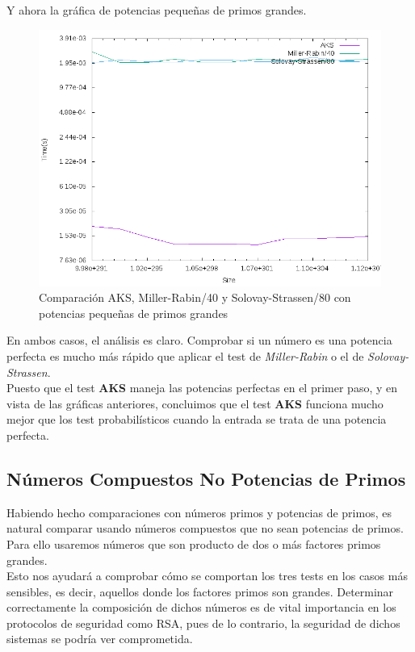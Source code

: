 Y ahora la gráfica de potencias pequeñas de primos grandes.

\begin{figure}[H]
	\centering
	\includegraphics[totalheight=12cm]{img/graphs/aks-probs-powers-5-mean}
	\caption{Comparación AKS, Miller-Rabin/40 y Solovay-Strassen/80 con potencias pequeñas de primos grandes}
\end{figure}

En ambos casos, el análisis es claro. Comprobar si un número es una potencia perfecta es mucho más rápido que aplicar el test de \textit{Miller-Rabin} o el de \textit{Solovay-Strassen}.\\

Puesto que el test \textbf{AKS} maneja las potencias perfectas en el primer paso, y en vista de las gráficas anteriores, concluimos que el test \textbf{AKS} funciona mucho mejor que los test probabilísticos cuando la entrada se trata de una potencia perfecta.

\subsection{Números Compuestos No Potencias de Primos}

Habiendo hecho comparaciones con números primos y potencias de primos, es natural comparar usando números compuestos que no sean potencias de primos. Para ello usaremos números que son producto de dos o más factores primos grandes.\\

Esto nos ayudará a comprobar cómo se comportan los tres tests en los casos más sensibles, es decir, aquellos donde los factores primos son grandes. Determinar correctamente la composición de dichos números es de vital importancia en los protocolos de seguridad como RSA, pues de lo contrario, la seguridad de dichos sistemas se podría ver comprometida.\\

